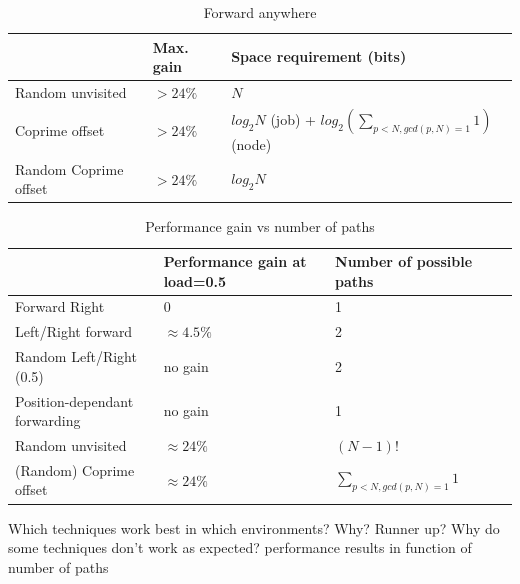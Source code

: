 \documentclass[10pt,a4paper]{article}
\begin{document}
\begin{table}[h!]
\centering
\begin{tabular}{|p{}|p{}|p{}|} \hline
							& Max. gain		& Space requirement (bits)	\\ \hline
Random unvisited			& $> 24\%$		& $N$						\\ \hline
Coprime offset				& $> 24\%$		& $log_2 N$ (job) + $log_2 (\sum_{p < N,gcd(p, N) = 1} 1)$ (node) \\ \hline
Random Coprime offset		& $> 24\%$		& $log_2 N$					\\ \hline
\end{tabular}
\caption{Forward anywhere}
\end{table}


\begin{table}
\centering
\begin{tabular}{|p{}|p{}|p{}|p{}|} \hline
 							& Performance gain at load=0.5	& Number of possible paths	\\ \hline
Forward Right				& 0								& 1							\\ \hline
Left/Right forward			& $\approx 4.5\%$				& 2							\\ \hline
Random Left/Right (0.5)		& no gain						& 2							\\ \hline
Position-dependant forwarding & no gain						& 1							\\ \hline
Random unvisited			& $\approx 24\%$						& $(N-1)!$					\\ \hline
(Random) Coprime offset		& $\approx 24\%$						& $\sum_{p < N,gcd(p, N) = 1} 1$ \\ \hline
\end{tabular}
\caption{Performance gain vs number of paths}
\end{table}

Which techniques work best in which environments? Why? Runner up? Why do some techniques don't work as expected? performance results in function of number of paths

\printbibliography
\newpage
\end{document}
